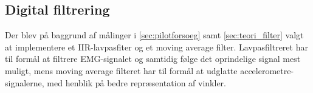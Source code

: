 \subsection{Digital filtrering}
Der blev på baggrund af målinger i \autoref{sec:pilotforsoeg} samt \autoref{sec:teori_filter} valgt at implementere et IIR-lavpasfiter og et moving average filter. Lavpasfiltreret har til formål at filtrere EMG-signalet og samtidig følge det oprindelige signal mest muligt, mens moving average filteret har til formål at udglatte accelerometre-signalerne, med henblik på bedre repræsentation af vinkler. 